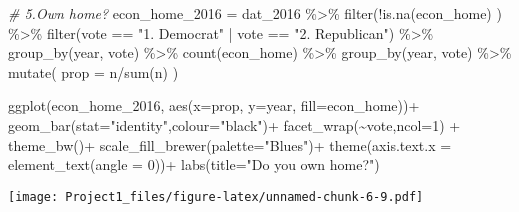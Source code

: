 \documentclass[
]{article}
\newenvironment{Shaded}{\begin{snugshade}}{\end{snugshade}}
\newcommand{\AttributeTok}[1]{\textcolor[rgb]{0.77,0.63,0.00}{#1}}
\newcommand{\CommentTok}[1]{\textcolor[rgb]{0.56,0.35,0.01}{\textit{#1}}}
\newcommand{\DecValTok}[1]{\textcolor[rgb]{0.00,0.00,0.81}{#1}}
\newcommand{\FunctionTok}[1]{\textcolor[rgb]{0.00,0.00,0.00}{#1}}
\newcommand{\NormalTok}[1]{#1}
\newcommand{\OtherTok}[1]{\textcolor[rgb]{0.56,0.35,0.01}{#1}}
\newcommand{\SpecialCharTok}[1]{\textcolor[rgb]{0.00,0.00,0.00}{#1}}
\newcommand{\StringTok}[1]{\textcolor[rgb]{0.31,0.60,0.02}{#1}}
\begin{document}
\begin{Shaded}
\begin{Highlighting}[]
\CommentTok{\# 5.Own home?}
\NormalTok{econ\_home\_2016 }\OtherTok{=}\NormalTok{ dat\_2016 }\SpecialCharTok{\%\textgreater{}\%}
  \FunctionTok{filter}\NormalTok{(}\SpecialCharTok{!}\FunctionTok{is.na}\NormalTok{(econ\_home) ) }\SpecialCharTok{\%\textgreater{}\%}
  \FunctionTok{filter}\NormalTok{(vote }\SpecialCharTok{==} \StringTok{"1. Democrat"} \SpecialCharTok{|}\NormalTok{ vote }\SpecialCharTok{==} \StringTok{"2. Republican"}\NormalTok{) }\SpecialCharTok{\%\textgreater{}\%}
  \FunctionTok{group\_by}\NormalTok{(year, vote) }\SpecialCharTok{\%\textgreater{}\%}
  \FunctionTok{count}\NormalTok{(econ\_home) }\SpecialCharTok{\%\textgreater{}\%}
  \FunctionTok{group\_by}\NormalTok{(year, vote) }\SpecialCharTok{\%\textgreater{}\%}
  \FunctionTok{mutate}\NormalTok{(}
    \AttributeTok{prop =}\NormalTok{ n}\SpecialCharTok{/}\FunctionTok{sum}\NormalTok{(n)}
\NormalTok{  )}


\FunctionTok{ggplot}\NormalTok{(econ\_home\_2016,}
       \FunctionTok{aes}\NormalTok{(}\AttributeTok{x=}\NormalTok{prop, }\AttributeTok{y=}\NormalTok{year, }\AttributeTok{fill=}\NormalTok{econ\_home))}\SpecialCharTok{+}
  \FunctionTok{geom\_bar}\NormalTok{(}\AttributeTok{stat=}\StringTok{"identity"}\NormalTok{,}\AttributeTok{colour=}\StringTok{"black"}\NormalTok{)}\SpecialCharTok{+}
  \FunctionTok{facet\_wrap}\NormalTok{(}\SpecialCharTok{\textasciitilde{}}\NormalTok{vote,}\AttributeTok{ncol=}\DecValTok{1}\NormalTok{) }\SpecialCharTok{+}
  \FunctionTok{theme\_bw}\NormalTok{()}\SpecialCharTok{+}
  \FunctionTok{scale\_fill\_brewer}\NormalTok{(}\AttributeTok{palette=}\StringTok{"Blues"}\NormalTok{)}\SpecialCharTok{+}
  \FunctionTok{theme}\NormalTok{(}\AttributeTok{axis.text.x =} \FunctionTok{element\_text}\NormalTok{(}\AttributeTok{angle =} \DecValTok{0}\NormalTok{))}\SpecialCharTok{+}
  \FunctionTok{labs}\NormalTok{(}\AttributeTok{title=}\StringTok{"Do you own home?"}\NormalTok{)}
\end{Highlighting}
\end{Shaded}

\texttt{[image: Project1\_files/figure-latex/unnamed-chunk-6-9.pdf]}
\end{document}
